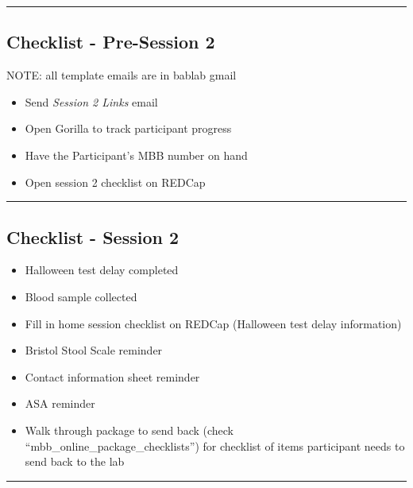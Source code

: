 \documentclass[]{book}
\providecommand{\tightlist}{%
  \setlength{\itemsep}{0pt}\setlength{\parskip}{0pt}}
\begin{document}
\begin{center}\rule{0.5\linewidth}{0.5pt}\end{center}

\hypertarget{checklist---pre-session-2-1}{%
\subsection{Checklist - Pre-Session 2}\label{checklist---pre-session-2-1}}

NOTE: all template emails are in bablab gmail

\begin{itemize}
\tightlist
\item
  Send \emph{Session 2 Links} email
\item
  Open Gorilla to track participant progress
\item
  Have the Participant's MBB number on hand
\item
  Open session 2 checklist on REDCap
\end{itemize}

\begin{center}\rule{0.5\linewidth}{0.5pt}\end{center}

\hypertarget{checklist---session-2-1}{%
\subsection{Checklist - Session 2}\label{checklist---session-2-1}}

\begin{itemize}
\tightlist
\item
  Halloween test delay completed
\item
  Blood sample collected\\
\item
  Fill in home session checklist on REDCap (Halloween test delay information)
\item
  Bristol Stool Scale reminder
\item
  Contact information sheet reminder
\item
  ASA reminder
\item
  Walk through package to send back (check ``mbb\_online\_package\_checklists'') for checklist of items participant needs to send back to the lab
\end{itemize}

\begin{center}\rule{0.5\linewidth}{0.5pt}\end{center}
\end{document}
